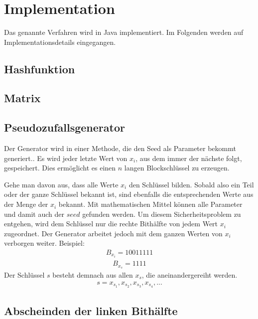 \documentclass[10pt,a4paper]{article}
\begin{document}
\section{Implementation}

Das genannte Verfahren wird in Java implementiert.
Im Folgenden werden auf Implementationsdetails eingegangen.

\subsection{Hashfunktion}

\subsection{Matrix}

\subsection{Pseudozufallsgenerator}

Der Generator wird in einer Methode, die den Seed als Parameter bekommt generiert..
Es wird jeder letzte Wert von $x_i$, aus dem immer der nächste folgt, gespeichert. Dies ermöglicht es einen $n$ langen Blockschlüssel zu erzeugen.

Gehe man davon aus, dass alle Werte $x_i$ den Schlüssel bilden. Sobald also ein Teil oder der ganze Schlüssel bekannt ist, sind ebenfalls die entsprechenden Werte aus der Menge der $x_i$ bekannt. Mit mathematischen Mittel können alle Parameter und damit auch der $seed$ gefunden werden.
Um diesem Sicherheitsproblem zu entgehen, wird dem Schlüssel nur die rechte Bithälfte von jedem Wert $x_i$ zugeordnet.
Der Generator arbeitet jedoch mit dem ganzen Werten von $x_i$ verborgen weiter.
Beispiel:
\begin{align*}
    B_{x_i} = 1001 1111
\end{align*}
\begin{align*}
    B_{x_s} = 1111
\end{align*}
Der Schlüssel $s$ besteht demnach aus allen $x_s$, die aneinandergereiht werden.
\begin{align*}
    s = x_{s_1}, x_{s_2}, x_{s_3}, x_{s_4}, ...
\end{align*}

\subsection{Abscheinden der linken Bithälfte}
\end{document}
